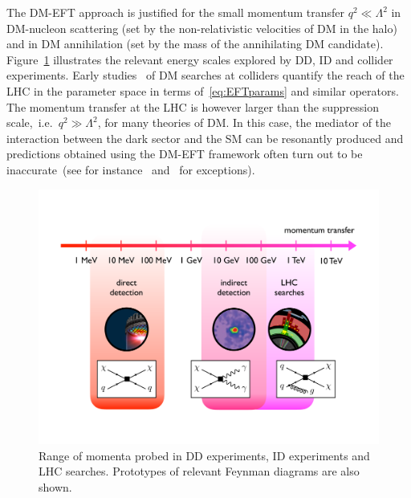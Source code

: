 \documentclass[a4paper, 11pt,notoc]{article}
\begin{document}
The DM-EFT approach is justified for the small momentum transfer $q^2\ll \Lambda^2$ in DM-nucleon scattering (set by the non-relativistic velocities of DM in the halo) and in DM annihilation (set by the mass of the annihilating DM candidate). Figure~\ref{fig:momentumtransfer}  illustrates the relevant energy scales explored by DD, ID and collider experiments. Early studies~\cite{Cao:2009uw,Beltran:2010ww,Goodman:2010yf,Bai:2010hh,Goodman:2010ku,Fox:2011pm} of DM searches at colliders quantify the reach of the LHC in the parameter space in terms of~\eqref{eq:EFTparams} and similar operators. The momentum transfer at the LHC is however larger than the suppression scale,~i.e.~$q^2 \gg \Lambda^2$, for many theories of DM.  In this case, the mediator of the interaction between the dark sector and the SM can be resonantly produced and predictions  obtained using the DM-EFT framework often turn out to be inaccurate~(see for instance~\cite{Bai:2010hh,Fox:2011fx,Shoemaker:2011vi,Busoni:2013lha,Buchmueller:2013dya,Busoni:2014sya,Busoni:2014haa,Racco:2015dxa} and~\cite{Bruggisser:2016nzw,Bruggisser:2016ixa} for exceptions). 

\begin{figure}[t!]
\centering
\includegraphics[width=.85\textwidth]{figure1.pdf}
\vspace{2mm}
\caption{\label{fig:momentumtransfer} Range of momenta probed in DD experiments, ID experiments and LHC searches. Prototypes of relevant Feynman diagrams are also shown. }
\end{figure}
\end{document}
